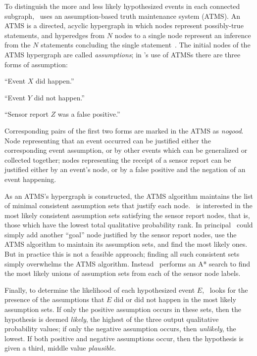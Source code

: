 {To distinguish the more and less likely hypothesized events in each
connected subgraph, \mifd\ uses an assumption-based truth maintenance
system (ATMS). An ATMS is a directed, acyclic hypergraph in which
nodes represent possibly-true statements, and hyperedges from $N$
nodes to a single node represent an inference from the $N$ statements
concluding the single statement~\cite{Forbus+DeKleer:1993}. The
initial nodes of the ATMS hypergraph are called \emph{assumptions}; in
\mifd's use of ATMSs there are three forms of assumption:
\begin{compactitem}
\item ``Event $X$ did happen.''
\item ``Event $Y$ did not happen.''
\item ``Sensor report $Z$ was a false positive.''
\end{compactitem}
Corresponding pairs of the first two forms are marked in the ATMS as
\emph{nogood}.  Node representing that an event occurred can be
justified either the corresponding event assumption, or by other
events which can be generalized or collected together; nodes
representing the receipt of a sensor report can be justified either by
an event's node, or by a false positive and the negation of an event
happening.

As an ATMS's hypergraph is constructed, the ATMS algorithm maintains
the list of minimal consistent assumption sets that justify each node.
\mifd\ is interested in the most likely consistent assumption sets
satisfying the sensor report nodes, that is, those which have the
lowest total qualitative probability rank.  In principal \mifd\ could
simply add another ``goal'' node justified by the sensor report nodes,
use the ATMS algorithm to maintain its assumption sets, and find the
most likely ones. But in practice this is not a feasible approach;
finding all such consistent sets simply overwhelms the ATMS algorithm.
Instead \mifd\ performs an A* search to find the most likely unions of
assumption sets from each of the sensor node labels.

Finally, to determine the likelihood of each hypothesized event $E$,
\mifd\ looks for the presence of the assumptions that $E$ did or did
not happen in the most likely assumption sets. If only the positive
assumption occurs in these sets, then the hypothesis is deemed
\emph{likely}, the highest of the three output qualitative probability
values; if only the negative assumption occurs, then \emph{unlikely},
the lowest. If both positive and negative assumptions occur, then the
hypothesis is given a third, middle value \emph{plausible}.}



